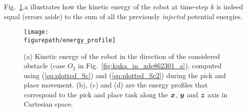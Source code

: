 Fig.~\ref{fig:energy_profile}.a illustrates how the kinetic energy of the robot at time-step $k$ is indeed equal (errors aside) to the sum of all the previously \textit{injected} potential energies.
\begin{figure}[!htbp]
\centering
{\texttt{[image: \\figurepath/energy\_profile]}}
\caption{(a) Kinetic energy of the robot in the direction of the considered obstacle (case $O_2$ in Fig.~\ref{fig:kuka_in_xde862301_a}), computed using (\ref{eq:plotted_Sc}) and (\ref{eq:plotted_Sc2}) during the pick and place movement. (b), (c) and (d) are the energy profiles that correspond to the pick and place task along the $\mbox{\boldmath${x}$}$, $\mbox{\boldmath${y}$}$ and $\mbox{\boldmath${z}$}$ axis in Cartesian space.} 
\label{fig:energy_profile}
\end{figure}

